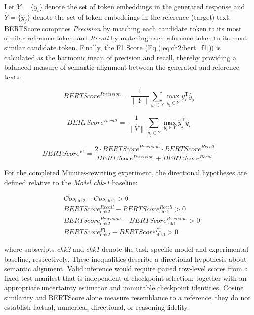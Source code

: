 Let $Y=\{y_i\}$ denote the set of token embeddings in the generated response and $\hat{Y}=\{\hat{y}_j\}$ denote the set of token embeddings in the reference (target) text. BERTScore computes \textit{Precision} by matching each candidate token to its most similar reference token, and \textit{Recall} by matching each reference token to its most similar candidate token. Finally, the F1 Score (Eq.(\ref{eq:ch2:bert_f1})) is calculated as the harmonic mean of precision and recall, thereby providing a balanced measure of semantic alignment between the generated and reference texts:

\begin{equation}\label{eq:ch2:bert_precision}
    BERTScore^{Precision} = \frac{1}{\|Y\|}\sum_{y_i \in Y} \max_{\hat{y}_j \in \hat{Y}} y_i^{\text{T}}\hat{y}_j
\end{equation}

\begin{equation}\label{eq:ch2:bert_recall}
    BERTScore^{Recall} = \frac{1}{\|\hat{Y}\|}\sum_{\hat{y}_j \in \hat{Y}} \max_{y_i \in Y} \hat{y}_j^{\text{T}}y_i
\end{equation}

\begin{equation}\label{eq:ch2:bert_f1}
    BERTScore^{F1} = \frac{2\cdot BERTScore^{Precision}\cdot BERTScore^{Recall}}{BERTScore^{Precision}+BERTScore^{Recall}}
\end{equation}


For the completed Minutes-rewriting experiment, the directional hypotheses are
defined relative to the \textit{Model chk-1} baseline:

\begin{equation*}
    \begin{split}
        &Cos_{\mathrm{chk2}} - Cos_{\mathrm{chk1}} > 0 \\
        &BERTScore^{Recall}_{\mathrm{chk2}} - BERTScore^{Recall}_{\mathrm{chk1}} > 0 \\
        &BERTScore^{Precision}_{\mathrm{chk2}} - BERTScore^{Precision}_{\mathrm{chk1}} > 0\\
        &BERTScore^{F1}_{\mathrm{chk2}} - BERTScore^{F1}_{\mathrm{chk1}} > 0
    \end{split}
\end{equation*}


where subscripts \textit{chk2} and \textit{chk1} denote the task-specific model
and experimental baseline, respectively. These inequalities describe a
directional hypothesis about semantic alignment. Valid inference would require
paired row-level scores from a fixed test manifest that is independent of
checkpoint selection, together with an appropriate uncertainty estimator and
immutable checkpoint identities. Cosine similarity and BERTScore alone measure
resemblance to a reference; they do not establish factual, numerical,
directional, or reasoning fidelity.


